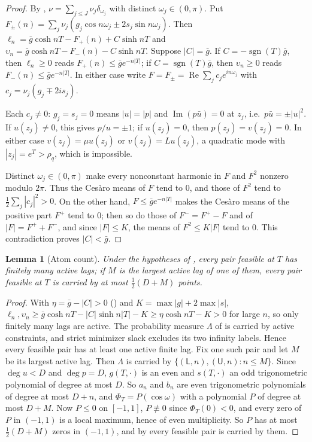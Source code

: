 \documentclass[11pt]{article}
\newtheorem{lemma}[theorem]{Lemma}
\theoremstyle{definition}
\theoremstyle{remark}
\newcommand{\ch}{\cosh}
\newcommand{\sh}{\sinh}
\newcommand{\Rea}{\operatorname{Re}}
\newcommand{\Ima}{\operatorname{Im}}
\begin{document}
\begin{proof}
By , \(\nu=\sum_{j\le J}\nu_j\delta_{\omega_j}\) with distinct \(\omega_j\in(0,\pi)\).  Put
\(F_\pm(n)=\sum_j\nu_j(g_j\cos n\omega_j\pm2s_j\sin n\omega_j)\).  Then
\(\ell_n=\bar g\ch nT-F_+(n)+C\sh nT\) and \(\upsilon_n=\bar g\ch nT-F_-(n)-C\sh nT\).  Suppose
\(|C|=\bar g\).  If \(C=-\operatorname{sgn}(T)\bar g\), then \(\ell_n\ge0\) reads \(F_+(n)\le\bar ge^{-n|T|}\);
if \(C=\operatorname{sgn}(T)\bar g\), then \(\upsilon_n\ge0\) reads \(F_-(n)\le\bar ge^{-n|T|}\).  In either case
write \(F=F_\pm=\Rea\sum_jc_je^{in\omega_j}\) with \(c_j=\nu_j(g_j\mp2is_j)\).

Each \(c_j\ne0\): \(g_j=s_j=0\) means \(|u|=|p|\) and \(\Ima(p\bar u)=0\) at \(z_j\), i.e.\ \(p\bar u=\pm|u|^2\).
If \(u(z_j)\ne0\), this gives \(p/u=\pm1\); if \(u(z_j)=0\), then \(p(z_j)=v(z_j)=0\).
In either case \(v(z_j)=\mu u(z_j)\) or \(v(z_j)=Lu(z_j)\), a quadratic mode with
\(|z_j|=e^T>\rho_q\), which is impossible.

Distinct \(\omega_j\in(0,\pi)\) make every nonconstant harmonic in \(F\) and \(F^2\)
nonzero modulo \(2\pi\).  Thus the Ces\`aro means of \(F\) tend to \(0\), and
those of \(F^2\) tend to \(\frac12\sum_j|c_j|^2>0\).  On the other hand,
\(F\le\bar ge^{-n|T|}\) makes the Ces\`aro means of the positive part \(F^+\) tend to \(0\);
then so do those of \(F^-=F^+-F\) and of \(|F|=F^++F^-\), and since \(|F|\le K\), the
means of \(F^2\le K|F|\) tend to \(0\).  This contradiction proves \(|C|<\bar g\).
\end{proof}

\begin{lemma}[Atom count]\label{lem:count}
Under the hypotheses of , every pair feasible at \(T\) has
finitely many active lags; if \(M\) is the largest active lag of one of
them, every pair feasible at \(T\) is carried by at most \(\frac12(D+M)\)
points.
\end{lemma}

\begin{proof}
With \(\eta=\bar g-|C|>0\) () and \(K=\max|g|+2\max|s|\),
\(\ell_n,\upsilon_n\ge\bar g\ch nT-|C|\sh n|T|-K\ge\eta\ch nT-K>0\) for large \(n\), so only finitely
many lags are active.
The probability measure \(\Lambda\) of  is carried
by active constraints, and strict minimizer slack excludes its two
infinity labels.  Hence every feasible pair has at least one active
finite lag.  Fix one such pair and let \(M\) be its largest active lag.
Then \(\Lambda\) is carried by
\(\{(\mathsf L,n),(\mathsf U,n):n\le M\}\).
Since \(\deg u<D\) and
\(\deg p=D\), \(g(T,\cdot)\) is an even and \(s(T,\cdot)\) an odd trigonometric polynomial of
degree at most \(D\).  So \(a_n\) and \(b_n\) are even trigonometric polynomials of
degree at most \(D+n\), and \(\Phi_T=P(\cos\omega)\) with a polynomial \(P\) of degree at
most \(D+M\).  Now \(P\le0\) on \([-1,1]\), \(P\not\equiv0\) since \(\Phi_T(0)<0\), and every zero of
\(P\) in \((-1,1)\) is a local maximum, hence of even multiplicity.  So \(P\) has at
most \(\frac12(D+M)\) zeros in \((-1,1)\), and by  every feasible pair is
carried by them.
\end{proof}
\end{document}
